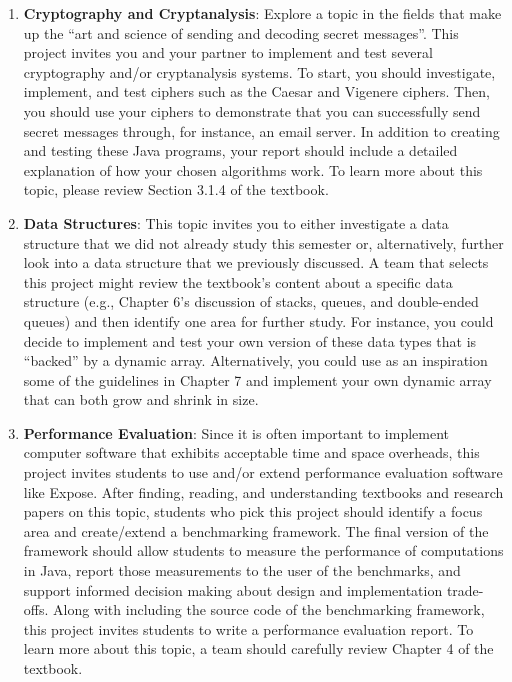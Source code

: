 \begin{enumerate}

  \item {\bf Cryptography and Cryptanalysis}: Explore a topic in the fields that make up the ``art and science of
    sending and decoding secret messages''. This project invites you and your partner to implement and test several
    cryptography and/or cryptanalysis systems.  To start, you should investigate, implement, and test ciphers such as
    the Caesar and Vigenere ciphers. Then, you should use your ciphers to demonstrate that you can successfully send
    secret messages through, for instance, an email server. In addition to creating and testing these Java programs,
    your report should include a detailed explanation of how your chosen algorithms work. To learn more about this
    topic, please review Section 3.1.4 of the textbook.

  \item {\bf Data Structures}: This topic invites you to either investigate a data structure that we did not already
    study this semester or, alternatively, further look into a data structure that we previously discussed. A team that
    selects this project might review the textbook's content about a specific data structure (e.g., Chapter 6's
    discussion of stacks, queues, and double-ended queues) and then identify one area for further study. For instance,
    you could decide to implement and test your own version of these data types that is ``backed'' by a dynamic array.
    Alternatively, you could use as an inspiration some of the guidelines in Chapter 7 and implement your own dynamic
    array that can both grow and shrink in size.


  \item {\bf Performance Evaluation}: Since it is often important to implement computer software that exhibits
    acceptable time and space overheads, this project invites students to use and/or extend performance evaluation
    software like Expose.  After finding, reading, and understanding textbooks and research papers on this topic,
    students who pick this project should identify a focus area and create/extend a benchmarking framework.  The final
    version of the framework should allow students to measure the performance of computations in Java, report those
    measurements to the user of the benchmarks, and support informed decision making about design and implementation
    trade-offs. Along with including the source code of the benchmarking framework, this project invites students to
    write a performance evaluation report. To learn more about this topic, a team should carefully review Chapter 4 of
    the textbook.


\end{enumerate}
